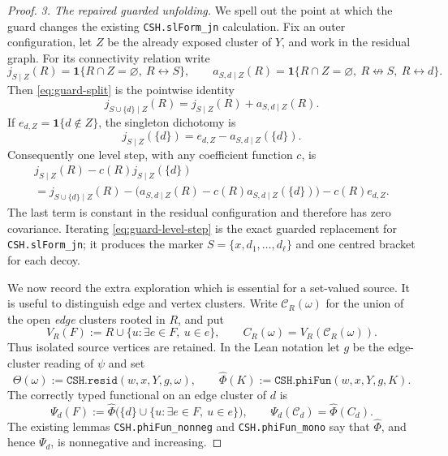 \documentclass[11pt]{article}
\theoremstyle{definition}
\theoremstyle{remark}
\newcommand{\one}{\mathbf 1}
\newcommand{\cC}{\mathcal C}
\newcommand{\con}{\leftrightarrow}
\newcommand{\ncon}{\not\leftrightarrow}
\newcommand{\lean}[1]{\texttt{#1}}
\begin{document}
\begin{proof}
\emph{3. The repaired guarded unfolding.}
We spell out the point at which the guard changes the existing
\lean{CSH.slForm\_jn} calculation.  Fix an outer configuration, let $Z$
be the already exposed cluster of $Y$, and work in the residual graph.
For its connectivity relation write
\[
 j_{S\mid Z}(R)=\one\{R\cap Z=\varnothing,\ R\con S\},\qquad
 a_{S,d\mid Z}(R)=\one\{R\cap Z=\varnothing,\ R\ncon S,\ R\con d\}.
\]
Then \eqref{eq:guard-split} is the pointwise identity
\begin{equation}\label{eq:guard-j-split}
 j_{S\cup\{d\}\mid Z}(R)=j_{S\mid Z}(R)+a_{S,d\mid Z}(R).
\end{equation}
If $e_{d,Z}=\one\{d\notin Z\}$, the singleton dichotomy is
\begin{equation}\label{eq:guard-singleton-dichotomy}
 j_{S\mid Z}(\{d\})=e_{d,Z}-a_{S,d\mid Z}(\{d\}).
\end{equation}
Consequently one level step, with any coefficient function $c$, is
\begin{multline}\label{eq:guard-level-step}
 j_{S\mid Z}(R)-c(R)j_{S\mid Z}(\{d\})\\
 =j_{S\cup\{d\}\mid Z}(R)
  -\bigl(a_{S,d\mid Z}(R)-c(R)a_{S,d\mid Z}(\{d\})\bigr)
  -c(R)e_{d,Z}.
\end{multline}
The last term is constant in the residual configuration and therefore
has zero covariance.  Iterating \eqref{eq:guard-level-step} is the exact
guarded replacement for \lean{CSH.slForm\_jn}; it produces the marker
$S=\{x,d_1,\ldots,d_\ell\}$ and one centred bracket for each decoy.

We now record the extra exploration which is essential for a set-valued
source.  It is useful to distinguish edge and vertex clusters.  Write
$\cC_R(\omega)$ for the union of the open \emph{edge} clusters rooted in
$R$, and put
\[
 V_R(F):=R\cup\{u:\exists e\in F,\ u\in e\},
 \qquad C_R(\omega)=V_R(\cC_R(\omega)).
\]
Thus isolated source vertices are retained.  In the Lean notation let
$g$ be the edge-cluster reading of $\psi$ and set
\[
 \Theta(\omega):=\lean{CSH.resid}(w,x,Y,g,\omega),\qquad
 \widehat\Phi(K):=\lean{CSH.phiFun}(w,x,Y,g,K).
\]
The correctly typed functional on an edge cluster of $d$ is
\begin{equation}\label{eq:typed-phi}
 \Psi_d(F):=\widehat\Phi\bigl(\{d\}\cup
                    \{u:\exists e\in F,\ u\in e\}\bigr),
 \qquad
 \Psi_d(\cC_d)=\widehat\Phi(C_d).
\end{equation}
The existing lemmas \lean{CSH.phiFun\_nonneg} and
\lean{CSH.phiFun\_mono} say that $\widehat\Phi$, and hence $\Psi_d$, is
nonnegative and increasing.


\end{proof}
\end{document}
